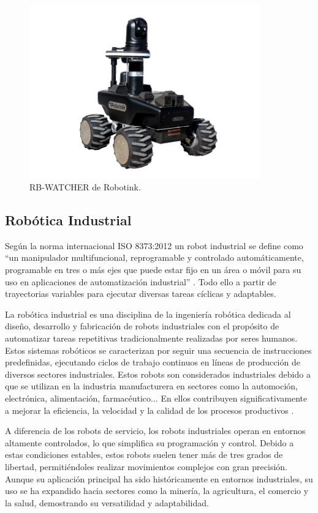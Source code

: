 \begin{figure} [h!]
  \begin{center}
    \includegraphics[width=10cm]{figs/Robot_intro}
  \end{center}
  \caption{\centering RB-WATCHER de Robotink.}
  \label{fig:Robot_intro}
\end{figure}

\subsection{Robótica Industrial}

Según la norma internacional ISO 8373:2012 un robot industrial se define como ``un manipulador multifuncional, reprogramable y controlado automáticamente, programable en tres o más ejes que puede estar fijo en un área o móvil para su uso en aplicaciones de automatización industrial'' \cite{definicion_iso}. Todo ello a partir de trayectorias variables para ejecutar diversas tareas cíclicas y adaptables. 

La robótica industrial es una disciplina de la ingeniería robótica dedicada al diseño, desarrollo y fabricación de robots industriales con el propósito de automatizar tareas repetitivas tradicionalmente realizadas por seres humanos. Estos sistemas robóticos se caracterizan por seguir una secuencia de instrucciones predefinidas, ejecutando ciclos de trabajo continuos en líneas de producción de diversos sectores industriales. Estos robots son considerados industriales debido a que se utilizan en la industria manufacturera en sectores como la automoción, electrónica, alimentación, farmacéutico... En ellos contribuyen significativamente a mejorar la eficiencia, la velocidad y la calidad de los procesos productivos \cite{info_robotica_industrial_1}. 

A diferencia de los robots de servicio, los robots industriales operan en entornos altamente controlados, lo que simplifica su programación y control. Debido a estas condiciones estables, estos robots suelen tener más de tres grados de libertad, permitiéndoles realizar movimientos complejos con gran precisión. Aunque su aplicación principal ha sido históricamente en entornos industriales, su uso se ha expandido hacia sectores como la minería, la agricultura, el comercio y la salud, demostrando su versatilidad y adaptabilidad. \\

